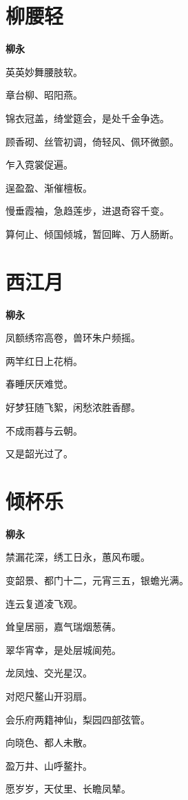\documentclass[12pt,a4paper]{ctexbook}
\begin{document}
\section{柳腰轻}
\textbf{柳永}\par\vspace{0.5em}
英英妙舞腰肢软。\par
章台柳、昭阳燕。\par
锦衣冠盖，绮堂筵会，是处千金争选。\par
顾香砌、丝管初调，倚轻风、佩环微颤。\par
乍入霓裳促遍。\par
逞盈盈、渐催檀板。\par
慢垂霞袖，急趋莲步，进退奇容千变。\par
算何止、倾国倾城，暂回眸、万人肠断。\par

\section{西江月}
\textbf{柳永}\par\vspace{0.5em}
凤额绣帘高卷，兽环朱户频摇。\par
两竿红日上花梢。\par
春睡厌厌难觉。\par
好梦狂随飞絮，闲愁浓胜香醪。\par
不成雨暮与云朝。\par
又是韶光过了。\par

\section{倾杯乐}
\textbf{柳永}\par\vspace{0.5em}
禁漏花深，绣工日永，蕙风布暖。\par
变韶景、都门十二，元宵三五，银蟾光满。\par
连云复道凌飞观。\par
耸皇居丽，嘉气瑞烟葱蒨。\par
翠华宵幸，是处层城阆苑。\par
龙凤烛、交光星汉。\par
对咫尺鳌山开羽扇。\par
会乐府两籍神仙，梨园四部弦管。\par
向晓色、都人未散。\par
盈万井、山呼鳌抃。\par
愿岁岁，天仗里、长瞻凤辇。\par
\end{document}
